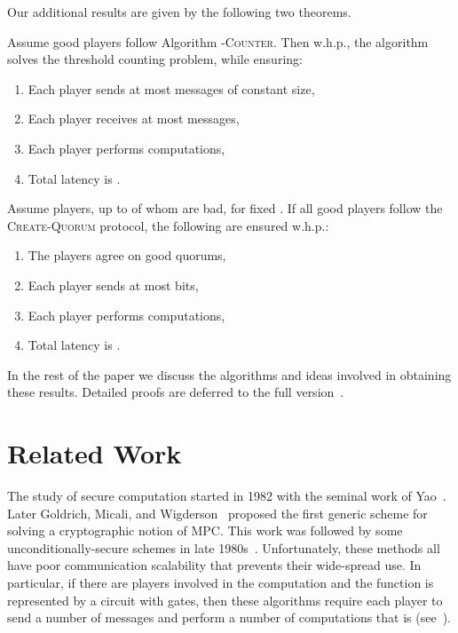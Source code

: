 \documentclass[10pt]{llncs}
\newcommand{\whp}{w.h.p.\xspace}
\newcommand{\tc}{\textsc{-Counter}\xspace}
\newcommand{\cq}{\textsc{Create-Quorum}\xspace}
\begin{document}
\noindent
Our additional results are given by the following two theorems.

\begin{theorem}
Assume  good players follow Algorithm \tc.   Then \whp, 
the algorithm solves the threshold counting problem, while ensuring:
\begin{enumerate}
\item Each player sends at most  messages of constant size,
\item Each player receives at most   messages,
\item Each player performs  computations,
\item Total latency is .
\end{enumerate}
\label{theo:2}
\end{theorem}


\begin{theorem}
Assume  players, up to  of whom are 
bad, for fixed .  If all good players follow the \cq protocol, the following are ensured \whp:
\begin{enumerate}
\item The players agree on  good quorums,
\item Each player sends at most  bits,
\item Each player performs  computations,
\item Total latency is .
\end{enumerate}
\label{thm:quorum-formation}
\end{theorem}

In the rest of the paper we discuss the algorithms and ideas involved in 
obtaining these results. Detailed proofs are deferred to the full 
version~\cite{dkms2013}.


\section{Related Work}

The study of secure computation started in 1982 with the seminal work
of Yao~\cite{yao1982protocols}. Later Goldrich, Micali, and
Wigderson~\cite{goldreich1987play} proposed the first generic scheme
for solving a cryptographic notion of MPC. This work was followed by
some unconditionally-secure schemes in late 1980s~\cite{benor_goldwasser_wigderson:completeness,chaum_crepeau_damgard:multiparty,rabin1989verifiable,benor_canetti_goldreich:asynchronous,hirt2001robustness,hirt2005upper,ZH06}. 
Unfortunately, these methods all have poor communication scalability that prevents their 
wide-spread use. In particular, if there are  players
involved in the computation and the function  is represented by a
circuit with  gates, then these algorithms require each player to
send a number of messages and perform a number of computations that is
 (see~\cite{frikken2010secure,goldreich1998secure,du2001secure}).
\end{document}
